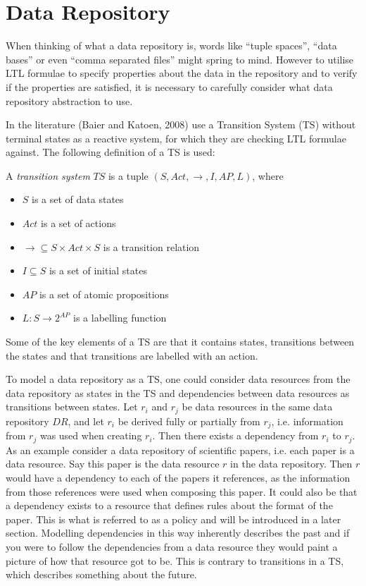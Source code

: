 \section{Data Repository}\label{sec:data-repository}
When thinking of what a data repository is, words like ``tuple spaces'', ``data bases'' or even ``comma separated files'' might spring to mind. However to utilise LTL formulae to specify properties about the data in the repository and to verify if the properties are satisfied, it is necessary to carefully consider what data repository abstraction to use. 

In the literature (Baier and Katoen, 2008)\cite{baier2008principles} use a Transition System (TS) without terminal states as a reactive system, for which they are checking LTL formulae against. The following definition of a TS is used:
\begin{definition}\label{def:ts}
A \emph{transition system} $TS$ is a tuple $\left(S, Act, \longrightarrow, I, AP, L \right)$, where
\begin{itemize}
  \item $S$ is a set of data states
  \item $Act$ is a set of actions
  \item $\longrightarrow \subseteq S \times Act \times S$ is a transition relation
  \item $I \subseteq S$ is a set of initial states
  \item $AP$ is a set of atomic propositions
  \item $L : S \rightarrow 2^{AP}$ is a labelling function
\end{itemize}
\end{definition}
Some of the key elements of a TS are that it contains states, transitions between the states and that transitions are labelled with an action.

To model a data repository as a TS, one could consider data resources from the data repository as states in the TS and dependencies between data resources as transitions between states. Let $r_i$ and $r_j$ be data resources in the same data repository $DR$, and let $r_i$ be derived fully or partially from $r_j$, i.e. information from $r_j$ was used when creating $r_i$. Then there exists a dependency from $r_i$ to $r_j$. As an example consider a data repository of scientific papers, i.e. each paper is a data resource. Say this paper is the data resource $r$ in the data repository. Then $r$ would have a dependency to each of the papers it references, as the information from those references were used when composing this paper. It could also be that a dependency exists to a resource that defines rules about the format of the paper. This is what is referred to as a policy and will be introduced in a later section. Modelling dependencies in this way inherently describes the past and if you were to follow the dependencies from a data resource they would paint a picture of how that resource got to be. This is contrary to transitions in a TS, which describes something about the future.

